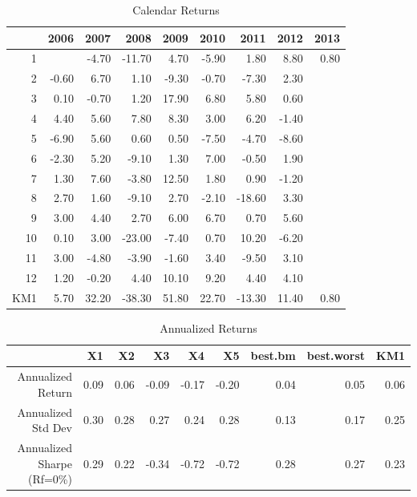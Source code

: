\documentclass{article}
\begin{document}
\begin{table}[ht]
\begin{center}
\caption{Calendar Returns}
\begin{tabular}{rrrrrrrrr}
  \hline
 & 2006 & 2007 & 2008 & 2009 & 2010 & 2011 & 2012 & 2013 \\ 
  \hline
1 &  & -4.70 & -11.70 & 4.70 & -5.90 & 1.80 & 8.80 & 0.80 \\ 
  2 & -0.60 & 6.70 & 1.10 & -9.30 & -0.70 & -7.30 & 2.30 &  \\ 
  3 & 0.10 & -0.70 & 1.20 & 17.90 & 6.80 & 5.80 & 0.60 &  \\ 
  4 & 4.40 & 5.60 & 7.80 & 8.30 & 3.00 & 6.20 & -1.40 &  \\ 
  5 & -6.90 & 5.60 & 0.60 & 0.50 & -7.50 & -4.70 & -8.60 &  \\ 
  6 & -2.30 & 5.20 & -9.10 & 1.30 & 7.00 & -0.50 & 1.90 &  \\ 
  7 & 1.30 & 7.60 & -3.80 & 12.50 & 1.80 & 0.90 & -1.20 &  \\ 
  8 & 2.70 & 1.60 & -9.10 & 2.70 & -2.10 & -18.60 & 3.30 &  \\ 
  9 & 3.00 & 4.40 & 2.70 & 6.00 & 6.70 & 0.70 & 5.60 &  \\ 
  10 & 0.10 & 3.00 & -23.00 & -7.40 & 0.70 & 10.20 & -6.20 &  \\ 
  11 & 3.00 & -4.80 & -3.90 & -1.60 & 3.40 & -9.50 & 3.10 &  \\ 
  12 & 1.20 & -0.20 & 4.40 & 10.10 & 9.20 & 4.40 & 4.10 &  \\ 
  KM1 & 5.70 & 32.20 & -38.30 & 51.80 & 22.70 & -13.30 & 11.40 & 0.80 \\ 
   \hline
\end{tabular}
\end{center}
\end{table}%
\begin{table}[ht]
\begin{center}
\caption{Annualized Returns}
\begin{tabular}{rrrrrrrrr}
  \hline
 & X1 & X2 & X3 & X4 & X5 & best.bm & best.worst & KM1 \\ 
  \hline
Annualized Return & 0.09 & 0.06 & -0.09 & -0.17 & -0.20 & 0.04 & 0.05 & 0.06 \\ 
  Annualized Std Dev & 0.30 & 0.28 & 0.27 & 0.24 & 0.28 & 0.13 & 0.17 & 0.25 \\ 
  Annualized Sharpe (Rf=0\%) & 0.29 & 0.22 & -0.34 & -0.72 & -0.72 & 0.28 & 0.27 & 0.23 \\ 
   \hline
\end{tabular}
\end{center}
\end{table}%
\end{document}
